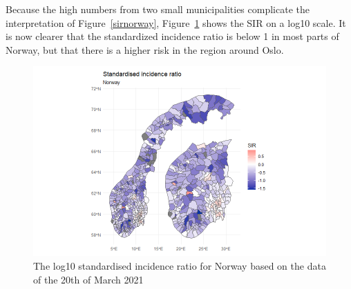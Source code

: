 Because the high numbers from two small municipalities complicate the interpretation of Figure~\ref{sirnorway}, Figure~\ref{sirnorwaylog} shows the SIR on a log10 scale. It is now clearer that the standardized incidence ratio is below 1 in most parts of Norway, but that there is a higher risk in the region around Oslo.
%   
\begin{figure}[H]
  \centering
  \includegraphics[width = 1.2\textwidth]{sir_norway_log.png}
  \caption{The log10 standardised incidence ratio for Norway based on the data of the 20th of March 2021}
  \label{sirnorwaylog}
\end{figure}
\clearpage
